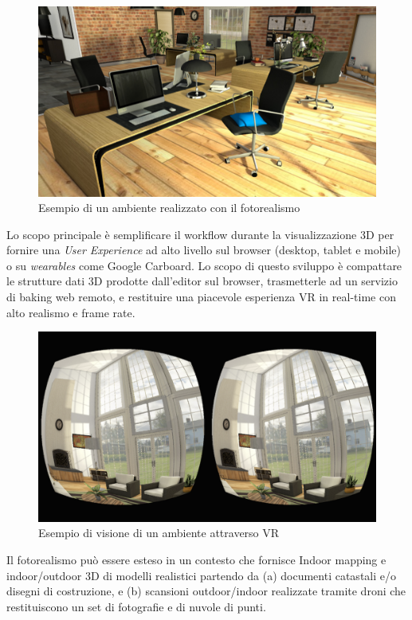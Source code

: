 \begin{figure}[htbp] %
   \centering
   \includegraphics[width=1\linewidth]{images/explorer-a-1}
   \caption{Esempio di un ambiente realizzato con il fotorealismo}
   \label{fig:revit}
   \end{figure}

Lo scopo principale \`e semplificare il workflow durante la visualizzazione 3D per fornire una \emph{User Experience}
ad alto livello sul browser (desktop, tablet e mobile) o su \emph{wearables} come Google Carboard.
\newpage
Lo scopo di questo sviluppo è compattare le strutture dati 3D prodotte dall'editor sul browser, trasmetterle ad un servizio di baking web remoto,
e restituire una piacevole esperienza VR in real-time con alto realismo e frame rate.

\begin{figure}[htbp] %
   \centering
   \includegraphics[width=1\linewidth]{images/vr}
   \caption{Esempio di visione di un ambiente attraverso VR}
   \label{fig:revit}
   \end{figure}

Il fotorealismo può essere esteso in un contesto che fornisce Indoor mapping e indoor/outdoor 3D di modelli realistici
partendo da (a) documenti catastali e/o disegni di costruzione, e (b) scansioni outdoor/indoor realizzate tramite droni
che restituiscono un set di fotografie e di nuvole di punti.\\
